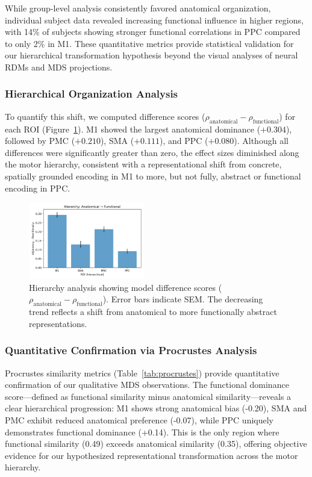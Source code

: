 \documentclass{article}
\begin{document}
While group-level analysis consistently favored anatomical organization, individual subject data revealed increasing functional influence in higher regions, with 14\% of subjects showing stronger functional correlations in PPC compared to only 2\% in M1. These quantitative metrics provide statistical validation for our hierarchical transformation hypothesis beyond the visual analyses of neural RDMs and MDS projections.

\subsubsection{Hierarchical Organization Analysis}
To quantify this shift, we computed difference scores (\(\rho_{\text{anatomical}} - \rho_{\text{functional}}\)) for each ROI (Figure~\ref{fig:hierarchy_analysis}). M1 showed the largest anatomical dominance (\(+0.304\)), followed by PMC (\(+0.210\)), SMA (\(+0.111\)), and PPC (\(+0.080\)). Although all differences were significantly greater than zero, the effect sizes diminished along the motor hierarchy, consistent with a representational shift from concrete, spatially grounded encoding in M1 to more, but not fully, abstract or functional encoding in PPC.
\begin{figure}[!htbp]
\centering
\includegraphics[width=0.45\textwidth]{results/hierarchy_adjacency_vs_functional.png}
\caption{Hierarchy analysis showing model difference scores (\(\rho_{\text{anatomical}} - \rho_{\text{functional}}\)). Error bars indicate SEM. The decreasing trend reflects a shift from anatomical to more functionally abstract representations.}
\label{fig:hierarchy_analysis}
\end{figure}

\subsubsection{Quantitative Confirmation via Procrustes Analysis}

Procrustes similarity metrics (Table~\ref{tab:procrustes}) provide quantitative confirmation of our qualitative MDS observations. The functional dominance score—defined as functional similarity minus anatomical similarity—reveals a clear hierarchical progression: M1 shows strong anatomical bias (-0.20), SMA and PMC exhibit reduced anatomical preference (-0.07), while PPC uniquely demonstrates functional dominance (+0.14). This is the only region where functional similarity (0.49) exceeds anatomical similarity (0.35), offering objective evidence for our hypothesized representational transformation across the motor hierarchy.
\end{document}
